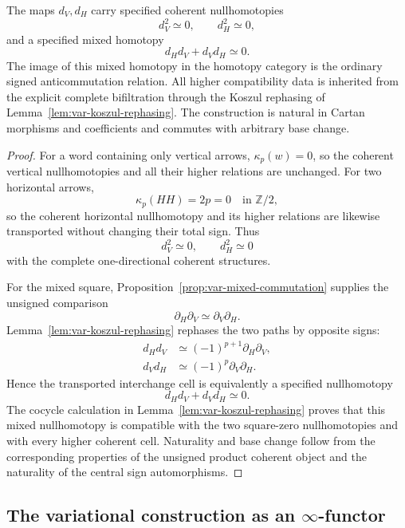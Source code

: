 \begin{theorem}
\label{thm:var-bicomplex}
The maps \(d_V,d_H\) carry specified coherent nullhomotopies
\[
    d_V^2\simeq0,
    \qquad
    d_H^2\simeq0,
\]
and a specified mixed homotopy
\[
    \boxed{
    d_Hd_V+d_Vd_H\simeq0.
    }
\]
The image of this mixed homotopy in the homotopy category is the ordinary signed anticommutation relation. All higher compatibility data is inherited from the explicit complete bifiltration through the Koszul rephasing of Lemma~\ref{lem:var-koszul-rephasing}. The construction is natural in Cartan morphisms and coefficients and commutes with arbitrary base change.
\end{theorem}

\begin{proof}
For a word containing only vertical arrows, \(\kappa_p(w)=0\), so the coherent vertical nullhomotopies and all their higher relations are unchanged. For two horizontal arrows,
\[
    \kappa_p(HH)=2p=0
    \quad\text{in }\mathbb Z/2,
\]
so the coherent horizontal nullhomotopy and its higher relations are likewise transported without changing their total sign. Thus
\[
    d_V^2\simeq0,
    \qquad
    d_H^2\simeq0
\]
with the complete one-directional coherent structures.

For the mixed square, Proposition~\ref{prop:var-mixed-commutation} supplies the unsigned comparison
\[
    \partial_H\partial_V
    \simeq
    \partial_V\partial_H.
\]
Lemma~\ref{lem:var-koszul-rephasing} rephases the two paths by opposite signs:
\[
\begin{aligned}
    d_Hd_V
    &\simeq
    (-1)^{p+1}\partial_H\partial_V,
    \\
    d_Vd_H
    &\simeq
    (-1)^p\partial_V\partial_H.
\end{aligned}
\]
Hence the transported interchange cell is equivalently a specified nullhomotopy
\[
    d_Hd_V+d_Vd_H\simeq0.
\]
The cocycle calculation in Lemma~\ref{lem:var-koszul-rephasing} proves that this mixed nullhomotopy is compatible with the two square-zero nullhomotopies and with every higher coherent cell. Naturality and base change follow from the corresponding properties of the unsigned product coherent object and the naturality of the central sign automorphisms.
\end{proof}

\subsection{The variational construction as an \(\infty\)-functor}
\label{subsec:var-infinity-functor}

